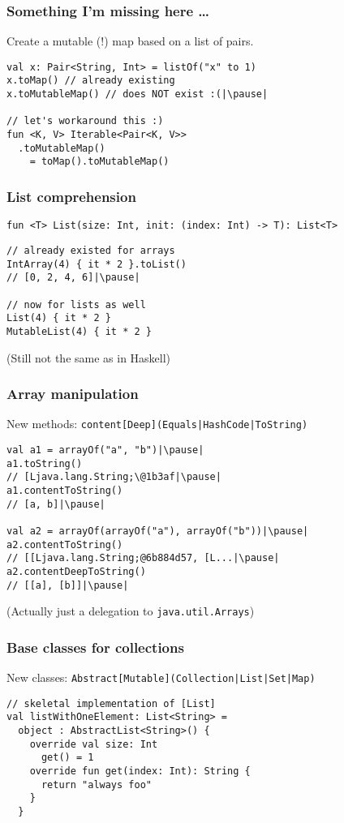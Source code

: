 \begin{frame}[fragile] \frametitle{Something I'm missing here \ldots}
Create a mutable (!) map based on a list of pairs.
\begin{lstlisting}
val x: Pair<String, Int> = listOf("x" to 1)
x.toMap() // already existing
x.toMutableMap() // does NOT exist :(|\pause|

// let's workaround this :)
fun <K, V> Iterable<Pair<K, V>>
  .toMutableMap()
    = toMap().toMutableMap()
\end{lstlisting}
\end{frame}

\begin{frame}[fragile] \frametitle{List comprehension}
\footnotesize{\texttt{fun <T> List(size: Int, init: (index: Int) -> T): List<T>}}\pause
\begin{lstlisting}
// already existed for arrays
IntArray(4) { it * 2 }.toList()
// [0, 2, 4, 6]|\pause|

// now for lists as well
List(4) { it * 2 }
MutableList(4) { it * 2 }
\end{lstlisting}
\small{(Still not the same as in Haskell)}
\end{frame}

\begin{frame}[fragile] \frametitle{Array manipulation}
New methods: \texttt{content[Deep](Equals|HashCode|ToString)}
\begin{lstlisting}
val a1 = arrayOf("a", "b")|\pause|
a1.toString()
// [Ljava.lang.String;\@1b3af|\pause|
a1.contentToString()
// [a, b]|\pause|

val a2 = arrayOf(arrayOf("a"), arrayOf("b"))|\pause|
a2.contentToString()
// [[Ljava.lang.String;@6b884d57, [L...|\pause|
a2.contentDeepToString()
// [[a], [b]]|\pause|
\end{lstlisting}
\small{(Actually just a delegation to \texttt{java.util.Arrays})}
\end{frame}

\begin{frame}[fragile] \frametitle{Base classes for collections}
New classes: \texttt{Abstract[Mutable](Collection|List|Set|Map)} \\
\begin{lstlisting}
// skeletal implementation of [List]
val listWithOneElement: List<String> =
  object : AbstractList<String>() {
    override val size: Int
      get() = 1
    override fun get(index: Int): String {
      return "always foo"
    }
  }
\end{lstlisting}
\end{frame}

